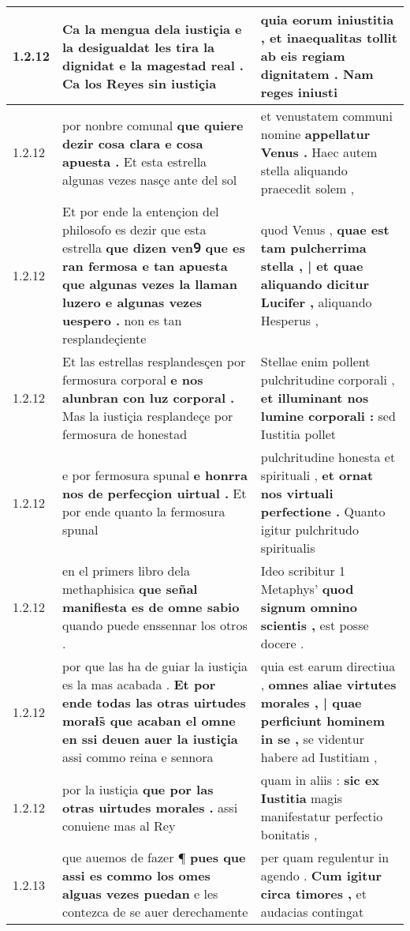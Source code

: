 \begin{tabular}{|p{1cm}|p{6.5cm}|p{6.5cm}|}
1.2.12 & Ca la mengua dela iustiçia \textbf{ e la desigualdat les tira la dignidat e la magestad real . } Ca los Reyes sin iustiçia & quia eorum iniustitia , \textbf{ et inaequalitas tollit ab eis regiam dignitatem . } Nam reges iniusti \\\hline
1.2.12 & por nonbre comunal \textbf{ que quiere dezir cosa clara e cosa apuesta . } Et esta estrella algunas vezes nasçe ante del sol & et venustatem communi nomine \textbf{ appellatur Venus . } Haec autem stella aliquando praecedit solem , \\\hline
1.2.12 & Et por ende la entençion del philosofo es dezir que esta estrella \textbf{ que dizen venꝮ que es ran fermosa e tan apuesta que algunas vezes la llaman luzero e algunas vezes uespero . } non es tan resplandeçiente & quod Venus , \textbf{ quae est tam pulcherrima stella , | et quae aliquando dicitur Lucifer , } aliquando Hesperus , \\\hline
1.2.12 & Et las estrellas resplandesçen por fermosura corporal \textbf{ e nos alunbran con luz corporal . } Mas la iustiçia resplandeçe por fermosura de honestad & Stellae enim pollent pulchritudine corporali , \textbf{ et illuminant nos lumine corporali : } sed Iustitia pollet \\\hline
1.2.12 & e por fermosura spunal \textbf{ e honrra nos de perfecçion uirtual . } Et por ende quanto la fermosura spunal & pulchritudine honesta et spirituali , \textbf{ et ornat nos virtuali perfectione . } Quanto igitur pulchritudo spiritualis \\\hline
1.2.12 & en el primers libro dela methaphisica \textbf{ que señal manifiesta es de omne sabio } quando puede enssennar los otros . & Ideo scribitur 1 Metaphys’ \textbf{ quod signum omnino scientis , } est posse docere . \\\hline
1.2.12 & por que las ha de guiar la iustiçia es la mas acabada . \textbf{ Et por ende todas las otras uirtudes morałs̃ que acaban el omne en ssi deuen auer la iustiçia } assi commo reina e sennora & quia est earum directiua , \textbf{ omnes aliae virtutes morales , | quae perficiunt hominem in se , } se videntur habere ad Iustitiam , \\\hline
1.2.12 & por la iustiçia \textbf{ que por las otras uirtudes morales . } assi conuiene mas al Rey & quam in aliis : \textbf{ sic ex Iustitia } magis manifestatur perfectio bonitatis , \\\hline
1.2.13 & que auemos de fazer ¶ \textbf{ pues que assi es commo los omes alguas vezes puedan } e les contezca de se auer derechamente & per quam regulentur in agendo . \textbf{ Cum igitur circa timores , } et audacias contingat \\\hline

\end{tabular}
